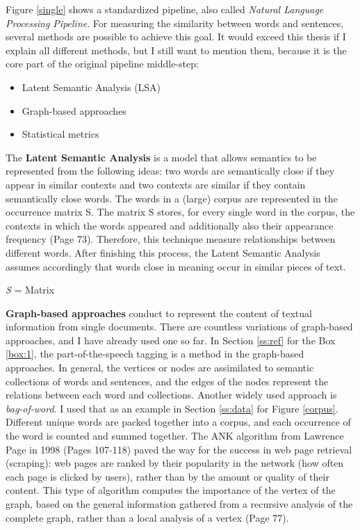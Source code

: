 Figure \ref{single} shows a standardized pipeline, also called \textit{Natural Language Processing Pipeline}. For measuring the similarity between words and sentences, several methods are possible to achieve this goal. It would exceed this thesis if I explain all different methods, but I still want to mention them, because it is the core part of the original pipeline middle-step:

\begin{itemize}
	\item Latent Semantic Analysis (LSA)
	\item Graph-based approaches
	\item Statistical metrics
\end{itemize}

The \textbf{Latent Semantic Analysis} \cite{Deerwester90indexingby} is a model that allows semantics to be represented from the following ideas: two words are semantically close if they appear in similar contexts and two contexts are similar if they contain semantically close words. The words in a (large) corpus are represented in the occurrence matrix S. The matrix S stores, for every single word in the corpus, the contexts in which the words appeared and additionally also their appearance frequency \cite{juan} (Page 73). Therefore, this technique measure relationships between different words. After finishing this process, the Latent Semantic Analysis assumes accordingly that words close in meaning occur in similar pieces of text.

\begin{tcolorbox}
	\textit{S} = Matrix
\end{tcolorbox}

\textbf{Graph-based approaches} conduct to represent the content of textual information from single documents. There are countless variations of graph-based approaches, and I have already used one so far. In Section \ref{ss:ref} for the Box \ref{box:1}, the part-of-the-speech tagging is a method in the graph-based approaches. In general, the vertices or nodes are assimilated to semantic collections of words and sentences, and the edges of the nodes represent the relations between each word and collections. 
Another widely used approach is \textit{bag-of-word}. I used that as an example in Section \ref{ss:data} for Figure \ref{corpus}. Different unique words are packed together into a corpus, and each occurrence of the word is counted and summed together. The ANK algorithm from Lawrence Page in 1998 \cite{brin1998anatomy} (Pages 107-118) paved the way for the success in web page retrieval (scraping): web pages are ranked by their popularity in the network (how often each page is clicked by users), rather than by the amount or quality of their content. This type of algorithm computes the importance of the vertex of the graph, based on the general information gathered from a recursive analysis of the complete graph, rather than a local analysis of a vertex \cite{juan} (Page 77).

